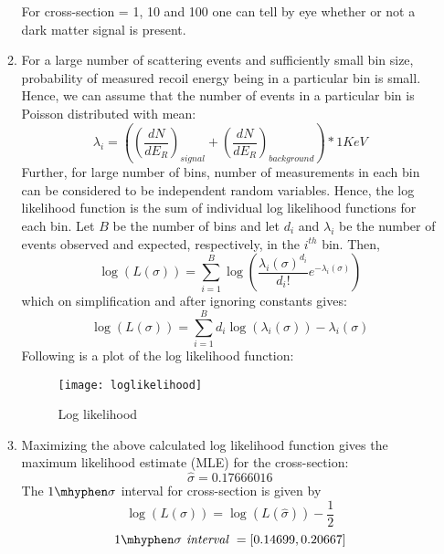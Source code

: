 \documentclass{article}
\begin{document}
\begin{enumerate}
\begin{enumerate}
\begin{figure}[!htb]
{\begin{minipage}{0.4\textwidth}
                \end{minipage}%
                }
                \end{figure}
            For cross-section = 1, 10 and 100 one can tell by eye whether or not a dark matter signal is present.
            \item
            For a large number of scattering events and sufficiently small bin size, probability of measured recoil energy being in a particular bin is small. Hence, we can assume that the number of events in a particular bin is Poisson distributed with mean:
            \[
                \lambda_i = \left( \left( \frac{dN}{dE_R}\right)_{signal} + \left( \frac{dN}{dE_R}\right)_{background}\right)*1 KeV
            \]
            Further, for large number of bins, number of measurements in each bin can be considered to be independent random variables. Hence, the log likelihood function is the sum of individual log likelihood functions for each bin. Let $B$ be the number of bins and let $d_i$ and $\lambda_i$ be the number of events observed and expected, respectively, in the $i^{th}$ bin. Then,
            \[
                \log (L(\sigma)) = \sum_{i=1}^{B} \log \left( \frac{\lambda_i(\sigma)^{d_i}}{d_i!} e^{-\lambda_i(\sigma)}\right)
            \]
            which on simplification and after ignoring constants gives:
            \[
                \log (L(\sigma)) = \sum_{i=1}^{B} d_i\log (\lambda_i(\sigma)) - \lambda_i(\sigma)
            \]
            Following is a plot of the log likelihood function:
            \begin{figure}[!htb]
            \centering
                    \texttt{[image: loglikelihood]}
                    \caption{Log likelihood}
            \end{figure}
            
        \item
        Maximizing the above calculated log likelihood function gives the maximum likelihood estimate (MLE) for the cross-section: 
        \[
            \hat{\sigma} = 0.17666016
        \]
        The $1\mhyphen \sigma$ interval for cross-section is given by 
        \[
            \log (L(\sigma)) = \log(L(\hat{\sigma})) -\frac{1}{2}
        \]
        \[
            1\mhyphen \sigma \textit{ interval }= [0.14699, 0.20667]
        \]
        \end{enumerate}
        
    \end{enumerate}
    
\end{document}
